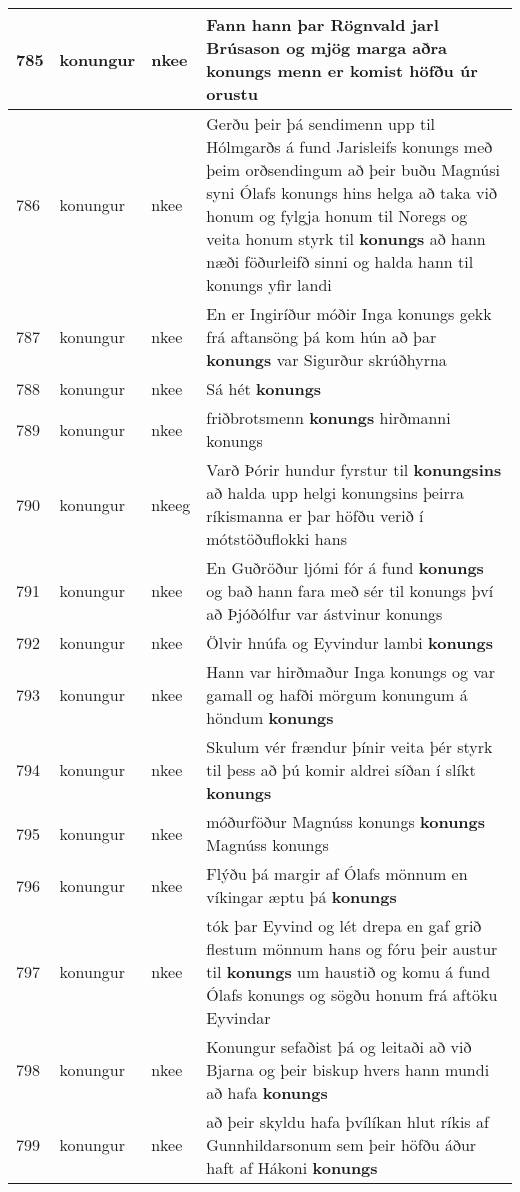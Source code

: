\documentclass{article}
\begin{document}
\begin{longtable}{p{1cm}|p{1cm}|p{1cm}|p{13cm}}
785&konungur&nkee&Fann hann þar Rögnvald jarl Brúsason og mjög marga aðra \textbf{konungs} menn er komist höfðu úr orustu\\
\hline
786&konungur&nkee&Gerðu þeir þá sendimenn upp til Hólmgarðs á fund Jarisleifs konungs með þeim orðsendingum að þeir buðu Magnúsi syni Ólafs konungs hins helga að taka við honum og fylgja honum til Noregs og veita honum styrk til \textbf{konungs} að hann næði föðurleifð sinni og halda hann til konungs yfir landi\\
\hline
787&konungur&nkee&En er Ingiríður móðir Inga konungs gekk frá aftansöng þá kom hún að þar \textbf{konungs} var Sigurður skrúðhyrna\\
\hline
788&konungur&nkee&Sá hét \textbf{konungs} \\
\hline
789&konungur&nkee&friðbrotsmenn \textbf{konungs} hirðmanni konungs\\
\hline
790&konungur&nkeeg&Varð Þórir hundur fyrstur til \textbf{konungsins} að halda upp helgi konungsins þeirra ríkismanna er þar höfðu verið í mótstöðuflokki hans\\
\hline
791&konungur&nkee&En Guðröður ljómi fór á fund \textbf{konungs} og bað hann fara með sér til konungs því að Þjóðólfur var ástvinur konungs\\
\hline
792&konungur&nkee&Ölvir hnúfa og Eyvindur lambi \textbf{konungs} \\
\hline
793&konungur&nkee&Hann var hirðmaður Inga konungs og var gamall og hafði mörgum konungum á höndum \textbf{konungs} \\
\hline
794&konungur&nkee&Skulum vér frændur þínir veita þér styrk til þess að þú komir aldrei síðan í slíkt \textbf{konungs} \\
\hline
795&konungur&nkee&móðurföður Magnúss konungs \textbf{konungs} Magnúss konungs\\
\hline
796&konungur&nkee&Flýðu þá margir af Ólafs mönnum en víkingar æptu þá \textbf{konungs} \\
\hline
797&konungur&nkee&tók þar Eyvind og lét drepa en gaf grið flestum mönnum hans og fóru þeir austur til \textbf{konungs} um haustið og komu á fund Ólafs konungs og sögðu honum frá aftöku Eyvindar\\
\hline
798&konungur&nkee&Konungur sefaðist þá og leitaði að við Bjarna og þeir biskup hvers hann mundi að hafa \textbf{konungs} \\
\hline
799&konungur&nkee&að þeir skyldu hafa þvílíkan hlut ríkis af Gunnhildarsonum sem þeir höfðu áður haft af Hákoni \textbf{konungs} \\

\end{longtable}
\end{document}
